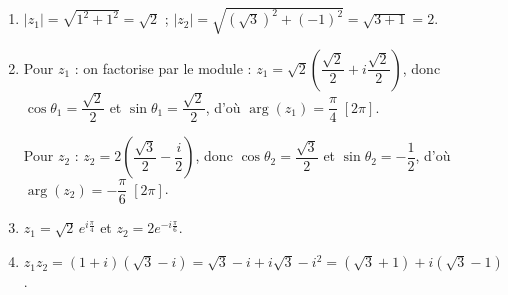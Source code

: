 \documentclass[11pt]{article}
\begin{document}
\begin{corrige}
\begin{enumerate}
\item $|z_1| = \sqrt{1^2 + 1^2} = \sqrt{2}$ ; $|z_2| = \sqrt{(\sqrt{3})^2 + (-1)^2} = \sqrt{3 + 1} = 2$.
\item Pour $z_1$ : on factorise par le module : $z_1 = \sqrt{2}\left(\dfrac{\sqrt{2}}{2} + i\dfrac{\sqrt{2}}{2}\right)$, donc $\cos\theta_1 = \dfrac{\sqrt{2}}{2}$ et $\sin\theta_1 = \dfrac{\sqrt{2}}{2}$, d'où $\arg(z_1) = \dfrac{\pi}{4}\;[2\pi]$.

Pour $z_2$ : $z_2 = 2\left(\dfrac{\sqrt{3}}{2} - \dfrac{i}{2}\right)$, donc $\cos\theta_2 = \dfrac{\sqrt{3}}{2}$ et $\sin\theta_2 = -\dfrac{1}{2}$, d'où $\arg(z_2) = -\dfrac{\pi}{6}\;[2\pi]$.
\item $z_1 = \sqrt{2}\,e^{i\frac{\pi}{4}}$ et $z_2 = 2e^{-i\frac{\pi}{6}}$.
\item $z_1 z_2 = (1 + i)(\sqrt{3} - i) = \sqrt{3} - i + i\sqrt{3} - i^2 = (\sqrt{3} + 1) + i(\sqrt{3} - 1)$.
\end{enumerate}
\end{corrige}
\end{document}

